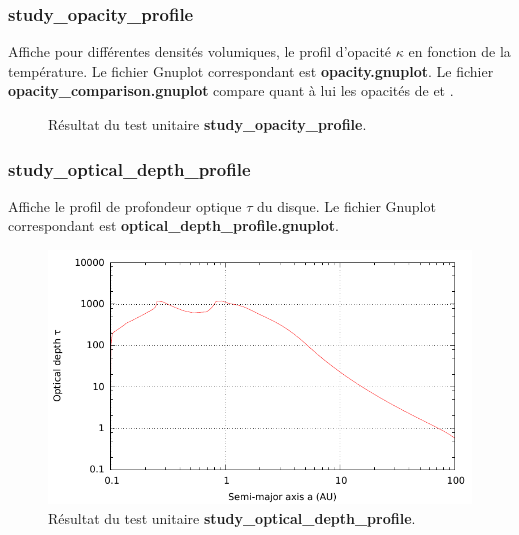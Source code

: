 \subsubsection{study\_opacity\_profile}
Affiche pour différentes densités volumiques, le profil d'opacité $\kappa$ en fonction de la température.  Le fichier Gnuplot
correspondant est \textbf{opacity.gnuplot}. Le fichier \textbf{opacity\_comparison.gnuplot} compare quant à lui les opacités de
\cite{bell1994FU} et \cite{zhu2009nonsteady}. 

\begin{figure}[htbp]
\centering
{}\hfill
{}

\caption{Résultat du test unitaire \textbf{study\_opacity\_profile}.}
\end{figure}

\subsubsection{study\_optical\_depth\_profile}
Affiche le profil de profondeur optique $\tau$ du disque. Le fichier Gnuplot correspondant est \textbf{optical\_depth\_profile.gnuplot}. 

\begin{figure}[htbp]
\centering
\includegraphics[width=0.65\linewidth]{figure/unitary_tests/optical_depth_profile.pdf}
\caption{Résultat du test unitaire \textbf{study\_optical\_depth\_profile}.}
\end{figure}

